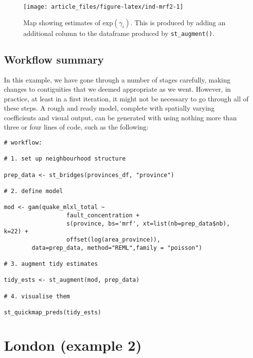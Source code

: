 \begin{figure}

{\centering \texttt{[image: article\_files/figure-latex/ind-mrf2-1]} 

}

\caption{Map showing estimates of \(\text{exp}(\gamma_i).\) This is produced by adding an additional column to the dataframe produced by \texttt{st\_augment()}.}\label{fig:ind-mrf2}
\end{figure}

\hypertarget{workflow-summary}{%
\subsection{Workflow summary}\label{workflow-summary}}

In this example, we have gone through a number of stages carefully, making changes to contiguities that we deemed appropriate as we went. However, in practice, at least in a first iteration, it might not be necessary to go through all of these steps. A rough and ready model, complete with spatially varying coefficients and visual output, can be generated with  using nothing more than three or four lines of code, such as the following:

\begin{verbatim}
# workflow:

# 1. set up neighbourhood structure

prep_data <- st_bridges(provinces_df, "province")

# 2. define model

mod <- gam(quake_mlxl_total ~ 
                  fault_concentration +
                  s(province, bs='mrf', xt=list(nb=prep_data$nb), k=22) +
                  offset(log(area_province)),
        data=prep_data, method="REML",family = "poisson")

# 3. augment tidy estimates

tidy_ests <- st_augment(mod, prep_data)

# 4. visualise them

st_quickmap_preds(tidy_ests)
\end{verbatim}

\hypertarget{london-example-2}{%
\section{London (example 2)}\label{london-example-2}}

